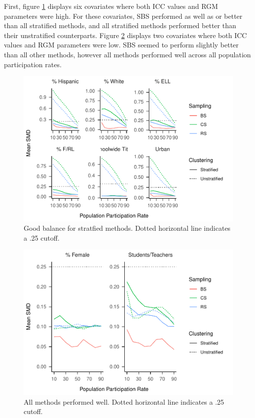 \documentclass[man,floatsintext]{apa6}
\begin{document}
First, figure \ref{fig:fig-SMD-by-Var-good1} displays six covariates where both ICC values and RGM parameters were high. For these covariates, SBS performed as well as or better than all stratified methods, and all stratified methods performed better than their unstratified counterparts. Figure \ref{fig:fig-SMD-by-Var-neutral} displays two covariates where both ICC values and RGM parameters were low. SBS seemed to perform slightly better than all other methods, however all methods performed well across all population participation rates.



\begin{figure}
\centering
\includegraphics{GenSamp-Paper_files/figure-latex/fig-SMD-by-Var-good1-1.pdf}
\caption{\label{fig:fig-SMD-by-Var-good1}Good balance for stratfied methods. Dotted horizontal line indicates a .25 cutoff.}
\end{figure}



\begin{figure}
\centering
\includegraphics{GenSamp-Paper_files/figure-latex/fig-SMD-by-Var-neutral-1.pdf}
\caption{\label{fig:fig-SMD-by-Var-neutral}All methods performed well. Dotted horizontal line indicates a .25 cutoff.}
\end{figure}
\end{document}
